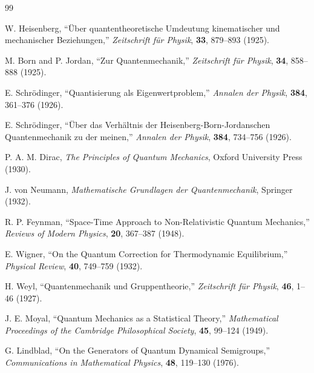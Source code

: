 \documentclass[11pt,a4paper]{article}
\begin{document}
\begin{thebibliography}{99}

 W. Heisenberg, ``\"Uber quantentheoretische Umdeutung kinematischer und mechanischer Beziehungen,'' \textit{Zeitschrift f\"ur Physik}, \textbf{33}, 879--893 (1925).

 M. Born and P. Jordan, ``Zur Quantenmechanik,'' \textit{Zeitschrift f\"ur Physik}, \textbf{34}, 858--888 (1925).

 E. Schr\"odinger, ``Quantisierung als Eigenwertproblem,'' \textit{Annalen der Physik}, \textbf{384}, 361--376 (1926).

 E. Schr\"odinger, ``\"Uber das Verh\"altnis der Heisenberg-Born-Jordanschen Quantenmechanik zu der meinen,'' \textit{Annalen der Physik}, \textbf{384}, 734--756 (1926).

 P. A. M. Dirac, \textit{The Principles of Quantum Mechanics}, Oxford University Press (1930).

 J. von Neumann, \textit{Mathematische Grundlagen der Quantenmechanik}, Springer (1932).

 R. P. Feynman, ``Space-Time Approach to Non-Relativistic Quantum Mechanics,'' \textit{Reviews of Modern Physics}, \textbf{20}, 367--387 (1948).

 E. Wigner, ``On the Quantum Correction for Thermodynamic Equilibrium,'' \textit{Physical Review}, \textbf{40}, 749--759 (1932).

 H. Weyl, ``Quantenmechanik und Gruppentheorie,'' \textit{Zeitschrift f\"ur Physik}, \textbf{46}, 1--46 (1927).

 J. E. Moyal, ``Quantum Mechanics as a Statistical Theory,'' \textit{Mathematical Proceedings of the Cambridge Philosophical Society}, \textbf{45}, 99--124 (1949).

 G. Lindblad, ``On the Generators of Quantum Dynamical Semigroups,'' \textit{Communications in Mathematical Physics}, \textbf{48}, 119--130 (1976).

\end{thebibliography}
\end{document}
